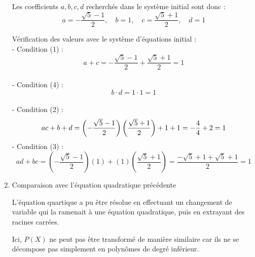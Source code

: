 \documentclass[10pt,a4paper]{article}
\begin{document}
\begin{enumerate}
    Les coefficients $a,b,c,d$ recherchés dans le système initial sont donc :
    $$a = -\frac{\sqrt{5} - 1}{2}, \quad b = 1, \quad c = \frac{\sqrt{5} + 1}{2}, \quad d = 1$$

    Vérification des valeurs avec le système d'équations initial :\\
      - Condition (1) : $$ a + c = -\frac{\sqrt{5} - 1}{2} + \frac{\sqrt{5} + 1}{2} = 1 $$ \\
      - Condition (4) : $$ b \cdot d = 1 \cdot 1 = 1 $$ \\
      - Condition (2) :
      $$
      ac + b + d = \left(-\frac{\sqrt{5} - 1}{2}\right)\left(\frac{\sqrt{5} + 1}{2}\right) + 1 + 1 = -\frac{4}{4} + 2 = 1 \\
      $$
      - Condition (3) :
      $$
      ad + bc = \left(-\frac{\sqrt{5} - 1}{2}\right)(1) + (1)\left(\frac{\sqrt{5} + 1}{2}\right) = \frac{-\sqrt{5} + 1 + \sqrt{5} + 1}{2} = 1
      $$

    \item Comparaison avec l'équation quadratique précédente

    L'équation quartique a pu être résolue en effectuant un changement de variable qui la ramenait à
    une équation quadratique, puis en extrayant des racines carrées.

    Ici, \( P(X) \) ne peut pas être transformé de manière similaire car ils ne se décompose pas
    simplement  en polynômes de degré inférieur.

\end{enumerate}

\end{document}
